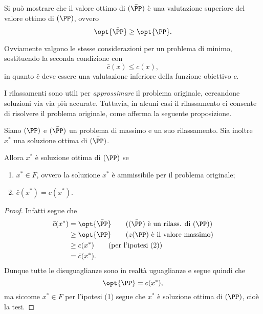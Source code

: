 Si può mostrare che il valore ottimo di $(\bar\PP)$ è una valutazione superiore del valore ottimo di $(\PP)$, ovvero \[
    \opt{\bar\PP} \geq \opt{\PP}.    
\]

Ovviamente valgono le stesse considerazioni per un problema di minimo, sostituendo la seconda condizione con \[
    \bar c(x) \leq c(x),
\] in quanto $\bar c$ deve essere una valutazione inferiore della funzione obiettivo $c$.

I rilassamenti sono utili per \emph{approssimare} il problema originale, cercandone soluzioni via via più accurate. Tuttavia, in alcuni casi il rilassamento ci consente di risolvere il problema originale, come afferma la seguente proposizione.

\begin{proposition}
    Siano $(\PP)$ e $(\bar\PP)$ un problema di massimo e un suo rilassamento. Sia inoltre $x^\ast$ una soluzione ottima di $(\bar\PP)$.

    Allora $x^\ast$ è soluzione ottima di $(\PP)$ se \begin{enumerate}[label={(\arabic*)}]
        \item $x^\ast \in F$, ovvero la soluzione $x^\ast$ è ammissibile per il problema originale;
        \item $\bar c(x^\ast) = c(x^\ast)$.
    \end{enumerate}
\end{proposition}
\begin{proof}
    Infatti segue che \begin{align*}
        \bar c(x^\ast) &= \opt{\bar\PP} \tag{$(\bar\PP)$ è un rilass. di $(\PP)$}\\
        &\geq \opt{\PP} \tag{$z(\PP)$ è il valore massimo}\\
        &\geq c(x^\ast) \tag{per l'ipotesi (2)}\\
        &= \bar c(x^\ast).
    \end{align*}
    Dunque tutte le disuguaglianze sono in realtà uguaglianze e segue quindi che \[
        \opt{\PP} = c(x^\ast),    
    \] ma siccome $x^\ast \in F$ per l'ipotesi (1) segue che $x^\ast$ è soluzione ottima di $(\PP)$, cioè la tesi.
\end{proof}